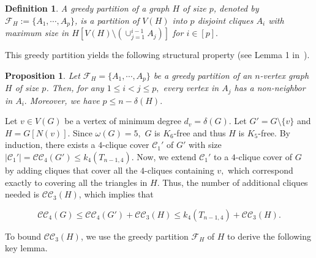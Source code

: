 \documentclass[11pt,a4paper]{article}
\newtheorem{dfn}{Definition}[section]
\newtheorem{prop}[thmo]{Proposition}
\newcommand{\dF}{{\mathcal{F}}}
\newcommand{\turangraph}[2]{T_{#1,#2}}
\newcommand{\coveropt}[2]{{\mathcal{C}\mathcal{C}_{#1}(#2)}}
\begin{document}
\begin{dfn}
A \textit{greedy partition} of a graph $H$ of size $p$, denoted by $\dF_H:= \{A_1, \cdots, A_p\}$,
is a partition of $V(H)$ into $p$ disjoint cliques $A_i$ with maximum size in $H[V(H)\setminus (\cup_{j=1}^{i-1}A_j)]$ for $i\in [p].$ 
\end{dfn}

This greedy partition yields the following structural property (see Lemma 1 in~\cite{DMP}).

\begin{prop}\label{Claim:p<n-delta}
	Let $\dF_H= \{A_1, \cdots, A_p\}$ be a greedy partition of an $n$-vertex graph $H$ of size $p$.
	Then, for any $1\leq i<j \leq p,$
	every vertex in $A_j$ has a non-neighbor in $A_i.$ 
    Moreover, we have 
	$p \leq n-\delta(H).$
\end{prop}

Let $v\in V(G)$ be a vertex of minimum degree $d_v=\delta(G).$
Let $G'=G\setminus \{v\}$ and $H=G[N(v)].$
Since $\omega(G)=5,$ 
$G$ is $K_6$-free and thus $H$ is $K_5$-free.
By induction, there exists a $4$-clique cover $\mathcal{C}_1'$ of $G'$ with size 
$|\mathcal{C}_1'|=\mathcal{C}\mathcal{C}_4(G')\le k_4(\turangraph{n-1}{4}).$
Now, we extend $\mathcal{C}_1'$ to a $4$-clique cover of $G$ by adding cliques that cover all the $4$-cliques containing $v,$
which correspond exactly to covering all the triangles in $H$. 
Thus, the number of additional cliques needed is $\coveropt{3}{H}$,
which implies that

\begin{equation}\label{Equ:CC_4(G)<=CC_4(G')+CC_3(H)}
    \coveropt{4}{G}\le \coveropt{4}{G'}+\coveropt{3}{H}\le  k_4(\turangraph{n-1}{4})+ \coveropt{3}{H}.
\end{equation}

To bound $\coveropt{3}{H}$, we use the greedy partition $\mathcal{F}_H$ of $H$ to derive the following key lemma.
\end{document}

